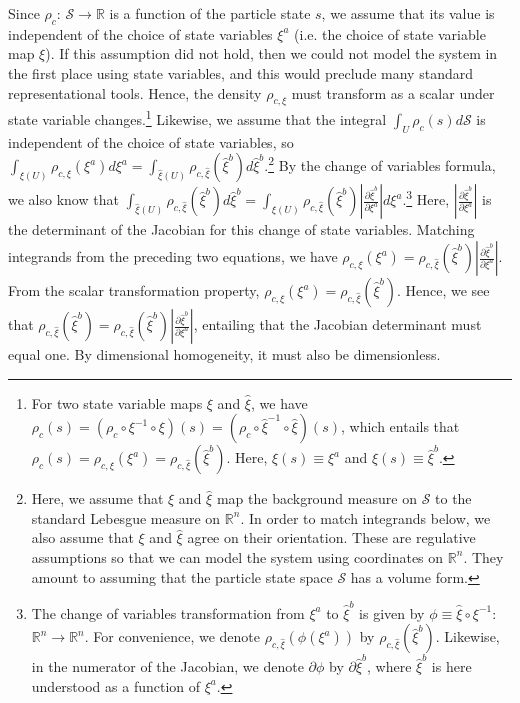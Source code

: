 \documentclass[12pt, english, twoside]{article} %
\begin{document}
Since $\rho_c$: $\mathcal{S} \to \mathbb{R}$ is a function of the particle state $s$, we assume that its value is independent of the choice of state variables $\xi^a$ (i.e. the choice of state variable map $\xi$). If this assumption did not hold, then we could not model the system in the first place using state variables, and this would preclude many standard representational tools. Hence, the density $\rho_{c, \xi}$ must transform as a scalar under state variable changes.\footnote{For two state variable maps $\xi$ and $\hat{\xi}$, we have $\rho_c(s) = (\rho_c \circ \xi^{-1} \circ \xi)(s) = (\rho_c \circ \hat{\xi}^{-1} \circ \hat{\xi})(s)$, which entails that $\rho_c(s) = \rho_{c, \xi} (\xi^a) = \rho_{c, \hat{\xi}} (\hat{\xi}^b)$. Here, $\xi(s) \equiv \xi^a$ and $\hat{\xi}(s) \equiv \hat{\xi}^b$.} Likewise, we assume that the integral $\int_U \rho_c(s) d\mathcal{S} $ is independent of the choice of state variables, so $\int_{\xi(U)} \rho_{c, \xi} (\xi^a) d \xi^a = \int_{\hat{\xi}(U)} \rho_{c, \hat{\xi}} (\hat{\xi}^b) d \hat{\xi}^b$.\footnote{Here, we assume that $\xi$ and $\hat{\xi}$ map the background measure on $\mathcal{S}$ to the standard Lebesgue measure on $\mathbb{R}^n$. In order to match integrands below, we also assume that $\xi$ and $\hat{\xi}$ agree on their orientation. These are regulative assumptions so that we can model the system using coordinates on $\mathbb{R}^n$. They amount to assuming that the particle state space $\mathcal{S}$ has a volume form.} By the change of variables formula, we also know that $\int_{\hat{\xi}(U)} \rho_{c, \hat{\xi}} (\hat{\xi}^b) d \hat{\xi}^b= \int_{\xi(U)} \rho_{c, \hat{\xi}} (\hat{\xi}^b) \left|\frac{\partial \hat{\xi}^b}{\partial \xi^a} \right|  d \xi^a$.\footnote{The change of variables transformation from $\xi^a$ to $\hat{\xi}^b$ is given by $\phi \equiv \hat{\xi} \circ \xi^{-1}$: $\mathbb{R}^n \to \mathbb{R}^n $. For convenience, we denote $\rho_{c, \hat{\xi}} (\phi(\xi^a))$ by $\rho_{c, \hat{\xi}} (\hat{\xi}^b)$. Likewise, in the numerator of the Jacobian, we denote $\partial \phi$ by $\partial \hat{\xi}^b$, where $\hat{\xi}^b$ is here understood as a function of $\xi^a$.} Here, $ \left|\frac{\partial \hat{\xi}^b}{\partial \xi^a} \right|$ is the determinant of the Jacobian for this change of state variables. Matching integrands from the preceding two equations, we have $\rho_{c, \xi} (\xi^a) = \rho_{c, \hat{\xi}} (\hat{\xi}^b) \left|\frac{\partial \hat{\xi}^b}{\partial \xi^a} \right|$. From the scalar transformation property, $\rho_{c, \xi} (\xi^a) = \rho_{c, \hat{\xi}} (\hat{\xi}^b)$. Hence, we see that $\rho_{c, \hat{\xi}} (\hat{\xi}^b) =  \rho_{c, \hat{\xi}} (\hat{\xi}^b) \left|\frac{\partial \hat{\xi}^b}{\partial \xi^a} \right|$, entailing that the Jacobian determinant must equal one. By dimensional homogeneity, it must also be dimensionless. 
\end{document}
